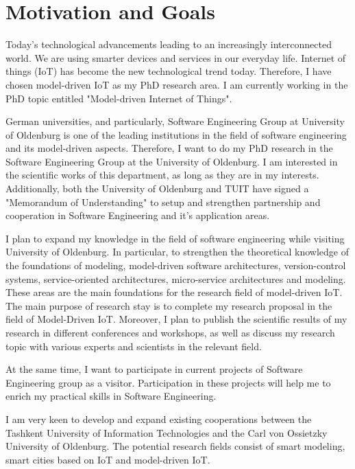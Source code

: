 \documentclass[10pt, oneside]{article}
\begin{document}
\section{Motivation and Goals}
Today’s technological advancements leading to an increasingly interconnected world. We are using smarter devices and services in our everyday life. Internet of things (IoT) has become the new technological trend today. Therefore, I have chosen model-driven IoT as my PhD research area. I am currently working in the PhD topic entitled "Model-driven Internet of Things".

German universities, and particularly, Software Engineering Group at University of Oldenburg is one of the leading institutions in the field of software engineering and its model-driven aspects. Therefore, I want to do my PhD research in the Software Engineering Group at the University of Oldenburg. I am interested in the scientific works of this department, as long as they are in my interests. Additionally, both the University of Oldenburg and TUIT have signed a "Memorandum of Understanding" to setup and strengthen partnership and cooperation in Software 
Engineering and it’s application areas. 

I plan to expand my knowledge in the field of software engineering while visiting University of Oldenburg. In particular, to strengthen the theoretical knowledge of the foundations of modeling, model-driven software architectures, version-control systems, service-oriented architectures, micro-service architectures and modeling. These areas are the main foundations for the research field of model-driven IoT. The main purpose of research stay is to complete my research proposal in the field of Model-Driven IoT. Moreover, I plan to publish the scientific results of my research in different conferences and workshops, as well as discuss my research topic with various experts and scientists in the relevant field.

At the same time, I want to participate in current projects of Software Engineering group as a visitor. Participation in these projects will help me to enrich my practical skills in Software Engineering.

I am very keen to develop and expand existing cooperations between the Tashkent University of Information Technologies and the Carl von Ossietzky University of Oldenburg. The potential research fields consist of smart modeling, smart cities based on IoT and model-driven IoT.
\end{document}
